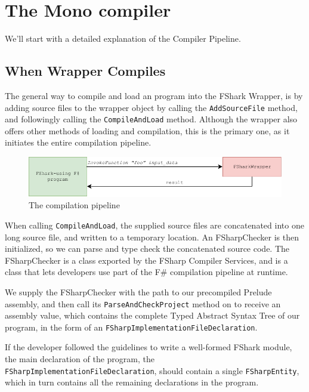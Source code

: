 \section{The Mono \csharp{} compiler}






We'll start with a detailed explanation of the \fshark{} Compiler Pipeline.

\subsection*{When \fshark{} Wrapper Compiles}
\label{sec:fsharkwrappercompiles}
The general way to compile and load an \fshark{} program into the FShark Wrapper,
is by adding \fshark{} source files to the wrapper object by calling the
\texttt{AddSourceFile} method, and followingly calling the \texttt{CompileAndLoad}
method. Although the \fshark{} wrapper also offers other methods of loading and
compilation, this is the primary one, as it initiates the entire \fshark{}
compilation pipeline.

\begin{figure}[h]
  \centering
  \includegraphics{chapters/figs/csharp/pipeline_step_3.pdf}
  \caption{The \fshark{} compilation pipeline}
  \label{fig:fsharkcompilerpipeline}
\end{figure}


When calling \texttt{CompileAndLoad}, the supplied \fshark{} source files are
concatenated into one long source file, and written to a temporary location.
An FSharpChecker is then initialized, so we can parse and type check the
concatenated source code. The FSharpChecker is a class exported by the FSharp
Compiler Services, and is a class that lets developers use part of the F\#
compilation pipeline at runtime.

We supply the FSharpChecker with the path to our precompiled \fshark{}Prelude
assembly, and then call its \texttt{ParseAndCheckProject} method on to receive
an assembly value, which contains the complete Typed Abstract Syntax Tree of our
\fshark{} program, in the form of an \texttt{FSharpImplementationFileDeclaration}.

If the \fshark{} developer followed the guidelines to write a well-formed FShark
module, the main declaration of the program, the
\texttt{FSharpImplementationFileDeclaration}, should contain a single
\texttt{FSharpEntity}, which in turn contains all the remaining declarations in
the program.


